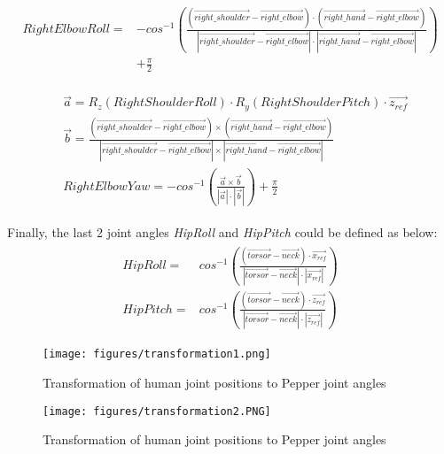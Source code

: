 \begin{align}
\begin{split}
RightElbowRoll = & - cos^{-1} \left( \frac{(\vec{right\_shoulder} - \vec{right\_elbow}) \cdot (\vec{right\_hand} -\vec{right\_elbow})}{|\vec{right\_shoulder} - \vec{right\_elbow}| \cdot |
 \vec{right\_hand} -\vec{right\_elbow}|} \right) \\ & + \frac{\pi}{2}
\end{split}
\end{align}

\begin{align}
\begin{split}
& \vec{a} = R_z(RightShoulderRoll) \cdot R_y(RightShoulderPitch) \cdot \vec{z_{ref}} \\
& \vec{b} = \frac{(\vec{right\_shoulder} - \vec{right\_elbow}) \times (\vec{right\_hand}  -\vec{right\_elbow})}{|\vec{right\_shoulder} - \vec{right\_elbow}| \times |\vec{right\_hand} -\vec{right\_elbow}|} \\
& RightElbowYaw = - cos^{-1} \left(\frac{\vec{a} \times \vec{b}}{|\vec{a}| \cdot |\vec{b}|} \right) + \frac{\pi}{2}
\end{split}
\end{align}

Finally, the last 2 joint angles \textit{HipRoll} and \textit{HipPitch} could be defined as below:
\begin{align}
\begin{split}
HipRoll = & cos^{-1} \left( \frac{(\vec{torsor} - \vec{neck}) \cdot \vec{x_{ref}}}{|\vec{torsor} - \vec{neck}| \cdot |\vec{x_{ref}}|}\right) \\ 
HipPitch = & cos^{-1} \left( \frac{(\vec{torsor} - \vec{neck}) \cdot \vec{z_{ref}}}{|\vec{torsor} - \vec{neck}| \cdot |\vec{z_{ref}}|}\right) 
\end{split}
\end{align}

\begin{figure}[th]
	\begin{center}
		\texttt{[image: figures/transformation1.png]}
	\end{center}
	\caption{Transformation of human joint positions to Pepper joint angles}
	\label{transformation1}
\end{figure}

\begin{figure}[t!]
	\begin{center}
		\texttt{[image: figures/transformation2.PNG]}
	\end{center}
	\caption{Transformation of human joint positions to Pepper joint angles}
	\label{transformation2}
\end{figure}

